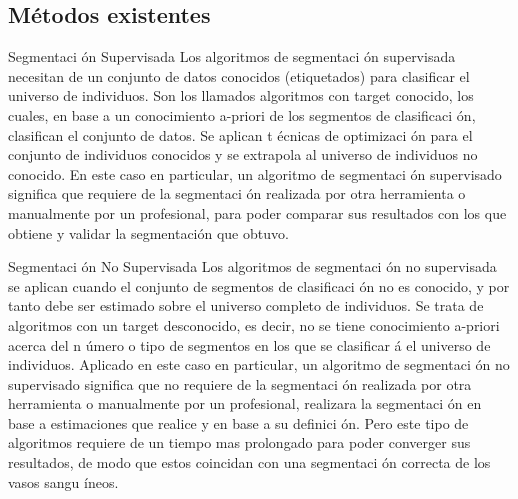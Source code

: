 \subsection{M\'etodos existentes}
Segmentaci \'on Supervisada
Los algoritmos de segmentaci \'on supervisada necesitan de un conjunto de datos conocidos (etiquetados) para clasificar el universo de individuos. Son los llamados algoritmos con target conocido, los cuales, en base a un conocimiento a-priori de los segmentos de clasificaci \'on, clasifican el conjunto de datos. Se aplican t \'ecnicas de optimizaci \'on para el conjunto de individuos conocidos y se extrapola al universo de individuos no conocido. En este caso en particular, un algoritmo de segmentaci \'on supervisado significa que requiere de la segmentaci \'on realizada por otra herramienta o manualmente por un profesional, para poder comparar sus resultados con los que obtiene y validar la segmentación que obtuvo.

Segmentaci \'on No Supervisada
Los algoritmos de segmentaci \'on no supervisada se aplican cuando el conjunto de segmentos de clasificaci \'on no es conocido, y por tanto debe ser estimado sobre el universo completo de individuos. Se trata de algoritmos con un target desconocido, es decir, no se tiene conocimiento a-priori acerca del n \'umero o tipo de segmentos en los que se clasificar \'a el universo de individuos. Aplicado en este caso en particular, un algoritmo de segmentaci \'on no supervisado significa que no requiere de la segmentaci \'on realizada por otra herramienta o manualmente por un profesional, realizara  la segmentaci \'on en base a estimaciones que realice y en base a su definici \'on. Pero este tipo de algoritmos requiere de un tiempo mas prolongado para poder converger sus resultados, de modo que estos coincidan con una segmentaci \'on correcta de los vasos sangu \'ineos.


